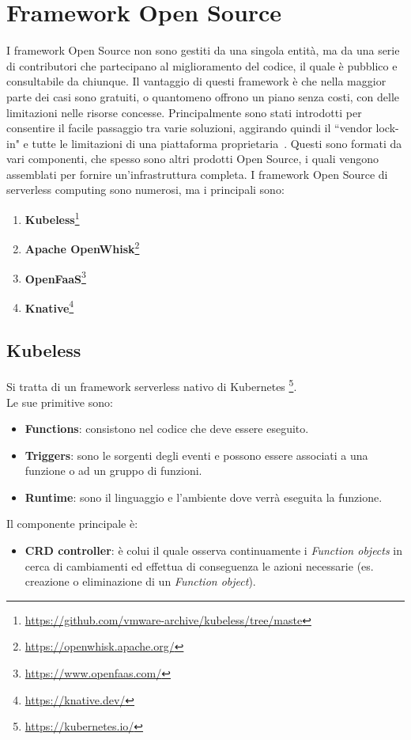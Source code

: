 \documentclass[12pt,a4paper,openany,twoside]{book}
\begin{document}
\section{Framework Open Source}

I framework Open Source non sono gestiti da una singola entità, ma da una serie di contributori che partecipano al miglioramento del codice, il quale è pubblico e consultabile da chiunque. Il vantaggio di questi framework è che nella maggior parte dei casi sono gratuiti, o quantomeno offrono un piano senza costi, con delle limitazioni nelle risorse concesse. Principalmente sono stati introdotti per consentire il facile passaggio tra varie soluzioni, aggirando quindi il ``vendor lock-in" e tutte le limitazioni di una piattaforma proprietaria~\cite{Yussupov2021}. Questi sono formati da vari componenti, che spesso sono altri prodotti Open Source, i quali vengono assemblati per fornire un'infrastruttura completa.
I framework Open Source di serverless computing sono numerosi, ma i principali sono:
\begin{enumerate}
    \item \textbf{Kubeless}\footnote{\url{https://github.com/vmware-archive/kubeless/tree/maste}}
    
    \item \textbf{Apache OpenWhisk}\footnote{\url{https://openwhisk.apache.org/}}
    
    \item \textbf{OpenFaaS}\footnote{\url{https://www.openfaas.com/}}
    
    \item \textbf{Knative}\footnote{\url{https://knative.dev/}}
\end{enumerate}

\subsection{Kubeless}

Si tratta di un framework serverless nativo di Kubernetes \footnote{\url{https://kubernetes.io/}}.
\\
Le sue primitive sono:
\begin{itemize}
    \item \textbf{Functions}: consistono nel codice che deve essere eseguito.
    
    \item \textbf{Triggers}: sono le sorgenti degli eventi e possono essere associati a una funzione o ad un gruppo di funzioni.
    
    \item \textbf{Runtime}: sono il linguaggio e l'ambiente dove verrà eseguita la funzione.
\end{itemize}
Il componente principale è:
\begin{itemize}
    \item \textbf{CRD controller}: è colui il quale osserva continuamente i \textit{Function objects} in cerca di cambiamenti ed effettua di conseguenza le azioni necessarie (es. creazione o eliminazione di un \textit{Function object}).
\end{itemize}
\end{document}
